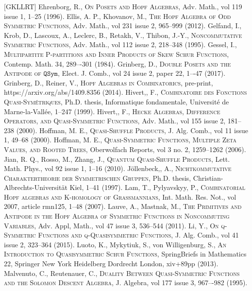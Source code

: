 \documentclass{article}
\theoremstyle{definition}
\begin{document}
\begin{thebibliography}{[GKLLRT]}
\bibitem[E]{[E]} Ehrenborg, R., \textsc{On Posets and Hopf Algebras}, Adv. Math., vol 119 issue 1, 1--25 (1996).
\bibitem[EK]{[EK]} Ellis, A. P., Khovanov, M., \textsc{The Hopf Algebra of Odd Symmetric Functions}, Adv. Math., vol 231 issue 2, 965--999 (2012).
\bibitem[GKLLRT]{[GKLLRT]} Gelfand, I., Krob, D., Lascoux, A., Leclerc, B., Retakh, V., Thibon, J.-Y., \textsc{Noncommutative Symmetric Functions}, Adv. Math., vol 112 issue 2, 218--348 (1995).
\bibitem[Ge]{[Ge]} Gessel, I., \textsc{Multipartite P-partitions and Inner Products of Skew Schur Functions}, Contemp. Math. 34, 289–-301 (1984).
\bibitem[Gr]{[Gr]} Grinberg, D., \textsc{Double Posets and the Antipode of $\mathtt{QSym}$}, Elect. J. Comb., vol 24 issue 2, paper 22, 1–-47 (2017).
\bibitem[GR]{[GR]} Grinberg, D., Reiner, V., \textsc{Hopf Algebras in Combinatorics}, pre-print, https://arxiv.org/abs/1409.8356 (2014).
\bibitem[Hi1]{[Hi1]} Hivert,, F., \textsc{Combinatoire des Fonctions Quasi-Sym\'{e}triques}, Ph.D. thesis, Informatique fondamentale, Universit\'{e} de Marne-la-Vall\'{e}e, 1--247 (1999).
\bibitem[Hi2]{[Hi2]} Hivert,, F., \textsc{Hecke Algebras, Difference Operators, and Quasi-Symmetric Functions}, Adv. Math., vol 155 issue 2, 181--238 (2000).
\bibitem[Ho1]{[Ho1]} Hoffman, M. E., \textsc{Quasi-Shuffle Products}, J. Alg. Comb., vol 11 issue 1, 49--68 (2000).
\bibitem[Ho2]{[Ho2]} Hoffman, M. E., \textsc{Quasi-Symmetric Functions, Multiple Zeta Values, and Rooted Trees}, Oberwolfach Reports, vol 3 no. 2, 1259--1262 (2006).
\bibitem[JRZ]{[JRZ]} Jian, R. Q., Rosso, M., Zhang, J., \textsc{Quantum Quasi-Shuffle Products}, Lett. Math. Phys., vol 92 issue 1, 1--16 (2010).
\bibitem[J]{[J]} J\"{o}llenbeck,, A., \textsc{Nichtkommutative Charaktertheorie der Symmetrischen Gruppen}, Ph.D. thesis, Christian-Albrechts-Universit\"{a}t Kiel, 1--41 (1997).
\bibitem[LP]{[LP]} Lam, T., Pylyavskyy, P., \textsc{Combinatorial Hopf algebras and K-homology of Grassmannians}, Int. Math. Res. Not., vol 2007, article rmn125, 1--48 (2007).
\bibitem[LM]{[LM]} Lauve, A., Mastnak, M., \textsc{The Primitives and Antipode in the Hopf Algebra of Symmetric Functions in Noncommuting Variables}, Adv. Appl, Math., vol 47 issue 3, 536--544 (2011).
\bibitem[L]{[L]} Li, Y., \textsc{On q-Symmetric Functions and q-Quasisymmetric Functions}, J. Alg. Comb., vol 41 issue 2, 323--364 (2015).
\bibitem[LMvW]{[LMvW]} Luoto, K., Mykytiuk, S., von Willigenburg, S., \textsc{An Introduction to Quasisymmetric Schur Functions}, SpringBriefs in Mathematics 22, Springer New York Heidelberg Dordrecht London, xiv+89pp (2013).
\bibitem[MR]{[MR]} Malvenuto, C., Reutenauer, C., \textsc{Duality Between Quasi-Symmetric Functions and the Solomon Descent Algebra}, J. Algebra, vol 177 issue 3, 967–-982 (1995).

\end{thebibliography}
\end{document}
